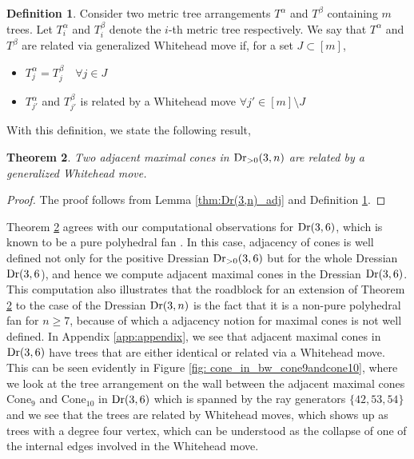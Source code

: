 \documentclass[12pt]{article}
\DeclareMathOperator{\Dr}{\rm Dr}
\theoremstyle{plain}
\newtheorem{theorem}{Theorem}
\theoremstyle{definition}
\newtheorem{definition}[theorem]{Definition}
\numberwithin{subcase}{case}
\begin{document}
\begin{definition}\label{def:gen_white_move}
Consider two metric tree arrangements $T^{\alpha}$ and $T^{\beta}$ containing $m$ trees. Let $T^{\alpha}_{i}$ and $T^{\beta}_{i}$ denote the $i$-th metric tree respectively.  We say that $T^{\alpha}$ and $T^{\beta}$ are related via generalized Whitehead move if, for a set $J \subset [m]$, 

\begin{itemize}
    \item $T^{\alpha}_{j} = T^{\beta}_{j} \quad \forall j \in J$
    \item $T^{\alpha}_{j'}$ and $T^{\beta}_{j'}$ is related by a Whitehead move $\forall j' \in [m] \setminus J$ 
\end{itemize}
\end{definition}

With this definition, we state the following result,

\begin{theorem}\label{thm:Dr(3,n)_adjacency}
Two adjacent maximal cones in $\Dr_{>0}(3,n)$ are related by a generalized Whitehead move.
\end{theorem}

\begin{proof}
The proof follows from Lemma \ref{thm:Dr(3,n)_adj} and Definition \ref{def:gen_white_move}.
\end{proof}


Theorem \ref{thm:Dr(3,n)_adjacency} agrees with our computational observations for $\Dr(3,6)$, which is known to be a pure polyhedral fan \cite{herrmann2009draw}. In this case, adjacency of cones is well defined not only for the positive Dressian $\Dr_{>0}(3,6)$ but for the whole Dressian $\Dr(3,6$), and hence we compute adjacent maximal cones in the Dressian $\Dr(3,6)$. This computation also illustrates that the roadblock for an extension of Theorem \ref{thm:Dr(3,n)_adjacency} to the case of the Dressian $\Dr(3,n)$ is the fact that it is a non-pure polyhedral fan for $n \geq 7$, because of which a adjacency notion for maximal cones is not well defined. In Appendix \ref{app:appendix}, we see that adjacent maximal cones in $\Dr(3,6)$ have trees that are either identical or related via a Whitehead move. This can be seen evidently in Figure \ref{fig: cone_in_bw_cone9andcone10}, where we look at the tree arrangement on the wall between the adjacent maximal cones Cone$_{9}$ and Cone$_{10}$ in $\Dr(3,6)$ which is spanned by the ray generators $\{42,53,54\}$ and we see that the trees are related by Whitehead moves, which shows up as trees with a degree four vertex, which can be understood as the collapse of one of the internal edges involved in the Whitehead move. 
\end{document}
